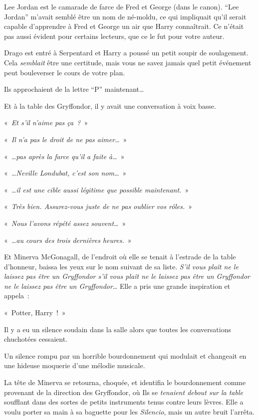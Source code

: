 Lee Jordan est le camarade de farce de Fred et George (dans le canon). “Lee Jordan” m'avait semblé être un nom de né-moldu, ce qui impliquait qu'il serait capable d'apprendre à Fred et George un air que Harry connaîtrait. Ce n'était pas aussi évident pour certains lecteurs, que ce le fut pour votre auteur.

\later

Drago est entré à Serpentard et Harry a poussé un petit soupir de soulagement. Cela \emph{semblait} être une certitude, mais vous ne savez jamais quel petit événement peut bouleverser le cours de votre plan.

Ils approchaient de la lettre “P” maintenant…

Et à la table des Gryffondor, il y avait une conversation à voix basse.

«~\emph{Et s'il n'aime pas ça~?}~»

«~\emph{Il n'a pas le droit de ne pas aimer…}~»

«~\emph{…pas après la farce qu'il a faite à…}~»

«~\emph{…Neville Londubat, c'est son nom…}~»

«~\emph{…il est une cible aussi légitime que possible maintenant.}~»

«~\emph{Très bien. Assurez-vous juste de ne pas oublier vos rôles.}~»

«~\emph{Nous l'avons répété assez souvent…}~»

«~\emph{…au cours des trois dernières heures.}~»

Et Minerva McGonagall, de l'endroit où elle se tenait à l'estrade de la table d'honneur, baissa les yeux sur le nom suivant de sa liste. \emph{S'il vous plaît ne le laissez pas être un Gryffondor s'il vous plaît ne le laissez pas être un Gryffondor  ne le laissez pas être un Gryffondor}… Elle a pris une grande inspiration et appela~:

«~Potter, Harry~!~»

Il y a eu un silence soudain dans la salle alors que toutes les conversations chuchotées cessaient.

Un silence rompu par un horrible bourdonnement qui modulait et changeait en une hideuse moquerie d'une mélodie musicale.

La tête de Minerva se retourna, choquée, et identifia le bourdonnement comme provenant de la direction des Gryffondor, où Ils se \emph{tenaient debout sur la table} soufflant dans des sortes de petits instruments tenus contre leurs lèvres. Elle a voulu porter sa main à sa baguette pour les \emph{Silencio}, mais un autre bruit l'arrêta.


